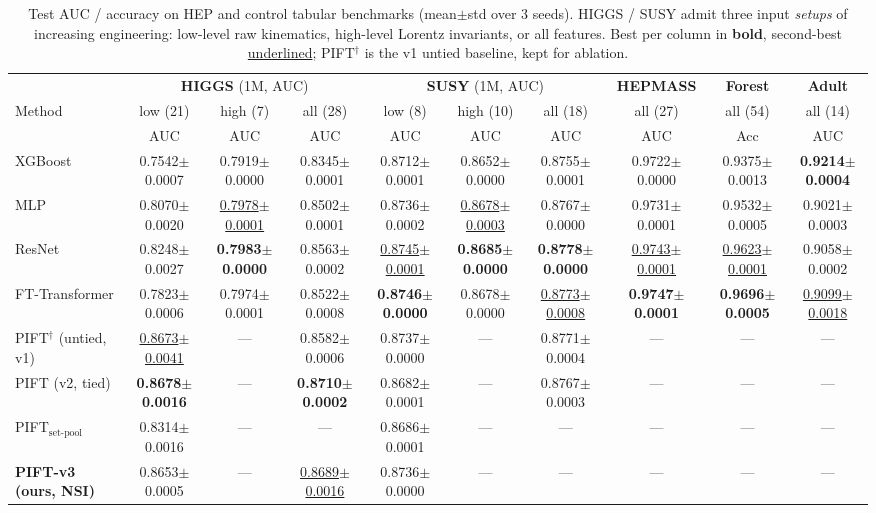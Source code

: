 \begin{table}[t]
\centering
\caption{Test AUC / accuracy on HEP and control tabular benchmarks (mean$\pm$std over 3 seeds).
HIGGS / SUSY admit three input \emph{setups} of increasing engineering: low-level raw kinematics, high-level
Lorentz invariants, or all features.  Best per column in \textbf{bold}, second-best \underline{underlined};
PIFT$^\dagger$ is the v1 untied baseline, kept for ablation.}
\label{tab:main}
\footnotesize
\setlength{\tabcolsep}{4pt}
\begin{tabular}{l ccc ccc c c c}
\toprule
& \multicolumn{3}{c}{\textbf{HIGGS} (1M, AUC)}& \multicolumn{3}{c}{\textbf{SUSY} (1M, AUC)}& \textbf{HEPMASS} & \textbf{Forest} & \textbf{Adult} \\
\cmidrule(lr){2-4}\cmidrule(lr){5-7}\cmidrule(lr){8-8}\cmidrule(lr){9-9}\cmidrule(lr){10-10}
Method & low (21) & high (7) & all (28) & low (8) & high (10) & all (18) & all (27) & all (54) & all (14) \\
& AUC & AUC & AUC & AUC & AUC & AUC & AUC & Acc & AUC \\
\midrule
XGBoost & 0.7542{\tiny$\pm$0.0007} & 0.7919{\tiny$\pm$0.0000} & 0.8345{\tiny$\pm$0.0001} & 0.8712{\tiny$\pm$0.0001} & 0.8652{\tiny$\pm$0.0000} & 0.8755{\tiny$\pm$0.0001} & 0.9722{\tiny$\pm$0.0000} & 0.9375{\tiny$\pm$0.0013} & \textbf{0.9214{\tiny$\pm$0.0004}} \\
MLP & 0.8070{\tiny$\pm$0.0020} & \underline{0.7978{\tiny$\pm$0.0001}} & 0.8502{\tiny$\pm$0.0001} & 0.8736{\tiny$\pm$0.0002} & \underline{0.8678{\tiny$\pm$0.0003}} & 0.8767{\tiny$\pm$0.0000} & 0.9731{\tiny$\pm$0.0001} & 0.9532{\tiny$\pm$0.0005} & 0.9021{\tiny$\pm$0.0003} \\
ResNet & 0.8248{\tiny$\pm$0.0027} & \textbf{0.7983{\tiny$\pm$0.0000}} & 0.8563{\tiny$\pm$0.0002} & \underline{0.8745{\tiny$\pm$0.0001}} & \textbf{0.8685{\tiny$\pm$0.0000}} & \textbf{0.8778{\tiny$\pm$0.0000}} & \underline{0.9743{\tiny$\pm$0.0001}} & \underline{0.9623{\tiny$\pm$0.0001}} & 0.9058{\tiny$\pm$0.0002} \\
FT-Transformer & 0.7823{\tiny$\pm$0.0006} & 0.7974{\tiny$\pm$0.0001} & 0.8522{\tiny$\pm$0.0008} & \textbf{0.8746{\tiny$\pm$0.0000}} & 0.8678{\tiny$\pm$0.0000} & \underline{0.8773{\tiny$\pm$0.0008}} & \textbf{0.9747{\tiny$\pm$0.0001}} & \textbf{0.9696{\tiny$\pm$0.0005}} & \underline{0.9099{\tiny$\pm$0.0018}} \\
\midrule
PIFT$^\dagger$ (untied, v1) & \underline{0.8673{\tiny$\pm$0.0041}} & — & 0.8582{\tiny$\pm$0.0006} & 0.8737{\tiny$\pm$0.0000} & — & 0.8771{\tiny$\pm$0.0004} & — & — & — \\
PIFT (v2, tied) & \textbf{0.8678{\tiny$\pm$0.0016}} & — & \textbf{0.8710{\tiny$\pm$0.0002}} & 0.8682{\tiny$\pm$0.0001} & — & 0.8767{\tiny$\pm$0.0003} & — & — & — \\
PIFT$_{\text{set-pool}}$ & 0.8314{\tiny$\pm$0.0016} & — & — & 0.8686{\tiny$\pm$0.0001} & — & — & — & — & — \\
\textbf{PIFT-v3 (ours, NSI)} & 0.8653{\tiny$\pm$0.0005} & — & \underline{0.8689{\tiny$\pm$0.0016}} & 0.8736{\tiny$\pm$0.0000} & — & — & — & — & — \\
\bottomrule
\end{tabular}
\end{table}
